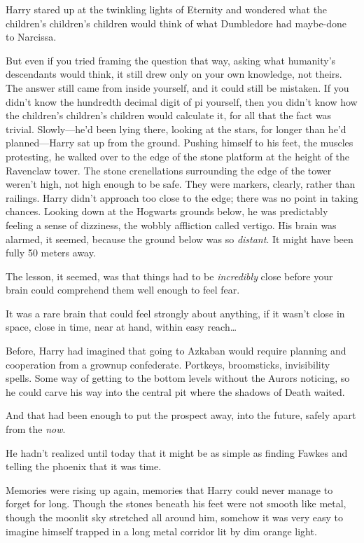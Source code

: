 Harry stared up at the twinkling lights of Eternity and wondered what the
children's children's children would think of what Dumbledore had maybe-done to
Narcissa.

But even if you tried framing the question that way, asking what humanity's
descendants would think, it still drew only on your own knowledge, not theirs.
The answer still came from inside yourself, and it could still be mistaken. If
you didn't know the hundredth decimal digit of pi yourself, then you didn't
know how the children's children's children would calculate it, for all that
the fact was trivial.
\later
Slowly---he'd been lying there, looking at the stars, for longer than he'd
planned---Harry sat up from the ground. Pushing himself to his feet, the
muscles protesting, he walked over to the edge of the stone platform at the
height of the Ravenclaw tower. The stone crenellations surrounding the edge of
the tower weren't high, not high enough to be safe. They were markers, clearly,
rather than railings. Harry didn't approach too close to the edge; there was no
point in taking chances. Looking down at the Hogwarts grounds below, he was
predictably feeling a sense of dizziness, the wobbly affliction called vertigo.
His brain was alarmed, it seemed, because the ground below was so
\emph{distant}. It might have been fully 50 meters away.

The lesson, it seemed, was that things had to be \emph{incredibly} close
before your brain could comprehend them well enough to feel fear.

It was a rare brain that could feel strongly about anything, if it wasn't close
in space, close in time, near at hand, within easy reach{\ldots}

Before, Harry had imagined that going to Azkaban would require planning and
cooperation from a grownup confederate. Portkeys, broomsticks, invisibility
spells. Some way of getting to the bottom levels without the Aurors noticing,
so he could carve his way into the central pit where the shadows of Death
waited.

And that had been enough to put the prospect away, into the future, safely
apart from the \emph{now}.

He hadn't realized until today that it might be as simple as finding Fawkes and
telling the phoenix that it was time.

Memories were rising up again, memories that Harry could never manage to forget
for long. Though the stones beneath his feet were not smooth like metal, though
the moonlit sky stretched all around him, somehow it was very easy to imagine
himself trapped in a long metal corridor lit by dim orange light.

